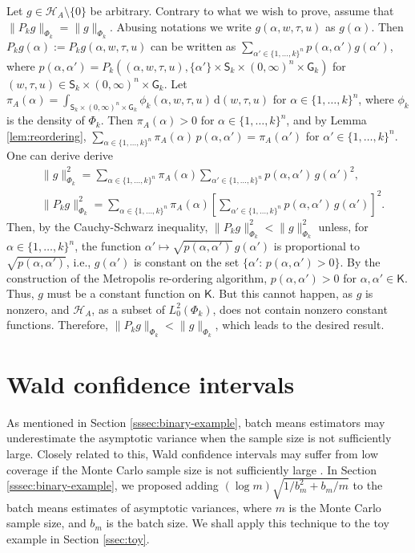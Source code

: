 \documentclass[12pt]{article}
\newcommand{\df}{\mathrm{d}}
\begin{document}
Let $g \in \mathcal{H}_A \setminus \{0\}$ be arbitrary.
Contrary to what we wish to prove, assume that $\|P_k g \|_{\Phi_k} = \|g\|_{\Phi_k}$.
Abusing notations we write $g(\alpha,w,\tau,u)$ as $g(\alpha)$.
Then $P_k g(\alpha) := P_k g(\alpha, w, \tau, u)$ can be written as $\sum_{\alpha' \in \{1,\dots,k\}^n} p(\alpha,\alpha') g(\alpha')$, where $p(\alpha,\alpha') = P_k((\alpha,w,\tau,u), \{\alpha'\} \times \mathsf{S}_k \times (0,\infty)^n \times \mathsf{G}_k)$ for $(w,\tau,u) \in  \mathsf{S}_k \times (0,\infty)^n \times \mathsf{G}_k$.
Let $\pi_A(\alpha) = \int_{\mathsf{S}_k \times (0,\infty)^n \times \mathsf{G}_k} \phi_k(\alpha,w,\tau,u) \, \df(w,\tau,u)$ for $\alpha \in \{1,\dots,k\}^n$, where $\phi_k$ is the density of $\Phi_k$.
Then $\pi_A(\alpha) > 0$ for $\alpha \in \{1,\dots,k\}^n$, and by Lemma \ref{lem:reordering}, $\sum_{\alpha \in \{1,\dots,k\}^n} \pi_A(\alpha) \, p(\alpha, \alpha') = \pi_A(\alpha')$ for $\alpha' \in \{1,\dots,k\}^n$.
One can derive derive
\[
\begin{aligned}
	& \|g\|_{\Phi_k}^2 = \sum_{\alpha \in \{1,\dots,k\}^n} \pi_A(\alpha) \sum_{\alpha' \in \{1,\dots,k\}^n} p(\alpha,\alpha') \, g(\alpha')^2, \\
	& \|P_k g\|_{\Phi_k}^2 = \sum_{\alpha \in \{1,\dots,k\}^n} \pi_A(\alpha) \left[ \sum_{\alpha' \in \{1,\dots,k\}^n} p(\alpha,\alpha') \, g(\alpha') \right]^2.
\end{aligned}
\]
Then, by the Cauchy-Schwarz inequality, $\|P_k g\|_{\Phi_k}^2 < \|g\|_{\Phi_k}^2$ unless, for $\alpha \in \{1,\dots,k\}^n$, the function $\alpha' \mapsto \sqrt{p(\alpha, \alpha') } \, g(\alpha')$ is proportional to $\sqrt{p(\alpha,\alpha')}$, i.e., $g(\alpha')$ is constant on the set $\{\alpha': \, p(\alpha,\alpha') > 0\}$.
By the construction of the Metropolis re-ordering algorithm, $p(\alpha,\alpha') > 0$ for $\alpha, \alpha' \in \mathsf{K}$.
Thus, $g$ must be a constant function on $\mathsf{K}$.
But this cannot happen, as $g$ is nonzero, and $\mathcal{H}_A$, as a subset of $L_0^2(\Phi_k)$, does not contain nonzero constant functions.
Therefore, $\|P_k g \|_{\Phi_k} < \|g\|_{\Phi_k}$, which leads to the desired result.

{
	\section{Wald confidence intervals} \label{app:wald}
}

As mentioned in Section \ref{sssec:binary-example}, batch means estimators may underestimate the asymptotic variance when the sample size is not sufficiently large.
Closely related to this, Wald confidence intervals may suffer from low coverage if the Monte Carlo sample size is not sufficiently large \citep{flegal2010batch,vollset1993confidence}.
In Section \ref{sssec:binary-example}, we proposed adding $(\log m) \sqrt{1/b_m^2 + b_m/m}$ to the batch means estimates of asymptotic variances, where $m$ is the Monte Carlo sample size, and $b_m$ is the batch size.
We shall apply this technique to the toy example in Section \ref{ssec:toy}.
\end{document}
